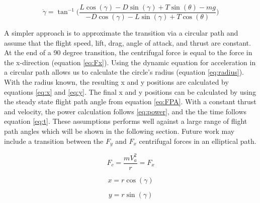 \documentclass[10pt,english]{article}
\begin{document}
\begin{equation}
\label{eq:angledot}
\dot{\gamma} = \tan^{-1} \Bigg(\frac{L \cos(\gamma) - D \sin(\gamma) + T \sin(\theta)- m g}{-D \cos(\gamma) - L \sin(\gamma) + T \cos(\theta)}\Bigg)
\end{equation}

\vspace{10pt}
A simpler approach is to approximate the transition via a circular path and assume that the flight speed, lift, drag, angle of attack, and thrust are constant.  At the end of a 90 degree transition, the centrifugal force is equal to the force in the x-direction (equation \ref{eq:Fx}).  Using the dynamic equation for acceleration in a circular path allows us to calculate the circle's radius (equation \ref{eq:radius}).  With the radius known, the resulting x and y positions are calculated by equations \ref{eq:x} and \ref{eq:y}.  The final x and y positions can be calculated by using the steady state flight path angle from equation \ref{eq:FPA}.  With a constant thrust and velocity, the power calculation follows \ref{eq:power}, and the the time follows equation \ref{eq:t}. These assumptions performs well against a large range of flight path angles which will be shown in the following section.  Future work may include a transition between the $F_y$ and $F_x$ centrifugal forces in an elliptical path.

\begin{equation}
\label{eq:radius}
F_c = \frac{m V_a^2}{r} = F_x
\end{equation}

%




\begin{equation}
\label{eq:x}
x = r \cos(\gamma)
\end{equation}

\begin{equation}
\label{eq:y}
y = r \sin(\gamma)
\end{equation}
\end{document}
